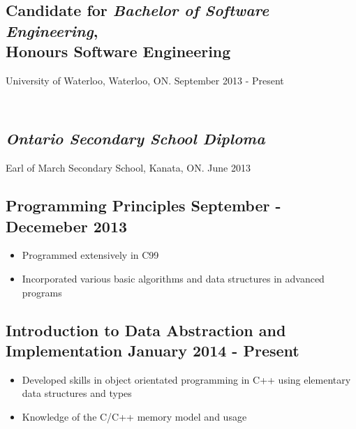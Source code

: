 \documentclass[10pt]{article}
\begin{document}
\begin{minipage}[t]{0.84\linewidth} 
	\subsection*{Candidate for \textit{Bachelor of Software Engineering}, \\ Honours Software Engineering} 								\vspace{-6pt}
		University of Waterloo, Waterloo, ON. \hspace{100pt} September 2013 - Present
	
	\subsection*{\textit{\\Ontario Secondary School Diploma}} \vspace{-6pt}
		Earl of March Secondary School, Kanata, ON. \hspace{138pt} June 2013\vspace{12pt}
		
	\subsection*{Programming Principles \hspace{135pt} \textnormal{September - Decemeber 2013}} \vspace{-6pt}
		\begin{itemize}
			\item Programmed extensively in C99
			\item Incorporated various basic algorithms and data structures in advanced programs
		\end{itemize}
		
	\subsection*{Introduction to Data Abstraction and Implementation \hspace{15pt} \textnormal{January 2014 - Present}} \vspace{-6pt} 
		\begin{itemize}
			\item Developed skills in object orientated programming in C++ using elementary data structures and 							types
			\item Knowledge of the C/C++ memory model and usage
		\end{itemize} \vspace{16pt}    
	

\end{minipage}
\end{document}
